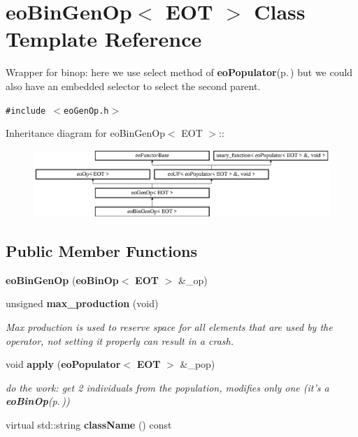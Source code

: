 \section{eo\-Bin\-Gen\-Op$<$ EOT $>$ Class Template Reference}
\label{classeo_bin_gen_op}
Wrapper for binop: here we use select method of {\bf eo\-Populator}{\rm (p.\,\pageref{classeo_populator})} but we could also have an embedded selector to select the second parent.  


{\tt \#include $<$eo\-Gen\-Op.h$>$}

Inheritance diagram for eo\-Bin\-Gen\-Op$<$ EOT $>$::\begin{figure}[H]
\begin{center}
\leavevmode
\includegraphics[height=2.54835cm]{classeo_bin_gen_op}
\end{center}
\end{figure}
\subsection*{Public Member Functions}
\begin{CompactItemize}
\item 
{\bf eo\-Bin\-Gen\-Op} ({\bf eo\-Bin\-Op}$<$ {\bf EOT} $>$ \&\_\-op)\label{classeo_bin_gen_op_a0}

\item 
unsigned {\bf max\_\-production} (void)\label{classeo_bin_gen_op_a1}

\begin{CompactList}\small\item\em Max production is used to reserve space for all elements that are used by the operator, not setting it properly can result in a crash. \item\end{CompactList}\item 
void {\bf apply} ({\bf eo\-Populator}$<$ {\bf EOT} $>$ \&\_\-pop)\label{classeo_bin_gen_op_a2}

\begin{CompactList}\small\item\em do the work: get 2 individuals from the population, modifies only one (it's a {\bf eo\-Bin\-Op}{\rm (p.\,\pageref{classeo_bin_op})}) \item\end{CompactList}\item 
virtual std::string {\bf class\-Name} () const \label{classeo_bin_gen_op_a3}

\end{CompactItemize}
